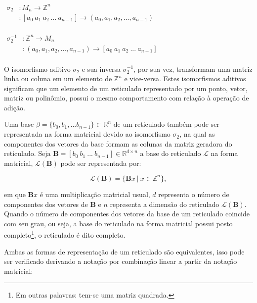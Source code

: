     $\begin{array}{rl}
            \sigma_2 &:M_n \to \mathbb{Z}^n\\
                   &:[a_0\ a_1\ a_2\ ...\ a_{n-1}] \to (a_0, a_1, a_2, ... , a_{n-1})
    \end{array}$\\\\

    $\begin{array}{rl}
            \sigma_2^{-1} &:\mathbb{Z}^n \to M_n\\
                   &:(a_0, a_1, a_2, ... , a_{n-1}) \to [a_0\ a_1\ a_2\ ...\ a_{n-1}]
    \end{array}$\\\\

    O isomorfismo aditivo $\sigma_2$ e sua inversa $\sigma_2^{-1}$, por sua vez, transformam uma matriz linha ou coluna em um elemento de $\mathbb{Z}^n$ e vice-versa. Estes isomorfismos aditivos significam que um elemento de um reticulado representado por um ponto, vetor, matriz ou polinômio, possui o mesmo comportamento com relação à operação de adição.

    Uma base $\beta = \{b_0, b_1, ... b_{n-1}\} \subset \mathbb{R}^{n}$ de um reticulado também pode ser representada na forma matricial devido ao isomorfismo $\sigma_2$, na qual as componentes dos vetores da base formam as colunas da matriz geradora do reticulado. Seja $\textbf{B} = [b_0\ b_1\ ...\ b_{n-1}] \in \mathbb{R}^{d \times n}$ a base do reticulado $\mathcal{L}$ na forma matricial, $\mathcal{L}(\textbf{B})$ pode ser representada por:

    $$\mathcal{L}(\textbf{B}) = \{\textbf{B}x\ |\ x \in \mathbb{Z}^n\},$$

    \noindent
    em que $\textbf{B}x$ é uma multiplicação matricial usual, $d$ representa o número de componentes dos vetores de $\textbf{B}$ e $n$ representa a dimensão do reticulado $\mathcal{L}(\textbf{B})$. Quando o número de componentes dos vetores da base de um reticulado coincide com seu grau, ou seja, a base do reticulado na forma matricial possui posto completo\footnote{Em outras palavras: tem-se uma matriz quadrada.}, o reticulado é dito completo.

    Ambas as formas de representação de um reticulado são equivalentes, isso pode ser verificado derivando a notação por combinação linear a partir da notação matricial:

